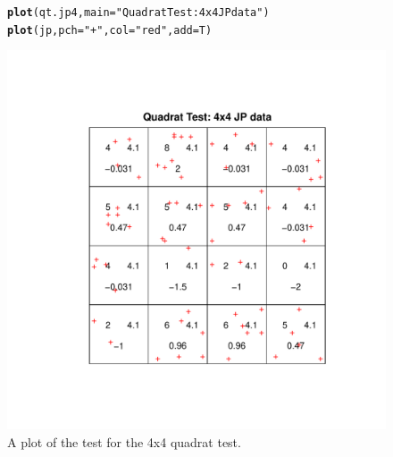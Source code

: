 \documentclass{article}\usepackage[]{graphicx}\usepackage[]{color}
\makeatletter
\def\maxwidth{ %
  \ifdim\Gin@nat@width>\linewidth
    \linewidth
  \else
    \Gin@nat@width
  \fi
}
\newcommand{\hlstr}[1]{\textcolor[rgb]{0.192,0.494,0.8}{#1}}%
\newcommand{\hlstd}[1]{\textcolor[rgb]{0.345,0.345,0.345}{#1}}%
\newcommand{\hlkwc}[1]{\textcolor[rgb]{0.333,0.667,0.333}{#1}}%
\newcommand{\hlkwd}[1]{\textcolor[rgb]{0.737,0.353,0.396}{\textbf{#1}}}%
\newenvironment{kframe}{%
 \def\at@end@of@kframe{}%
 \ifinner\ifhmode%
  \def\at@end@of@kframe{\end{minipage}}%
  \begin{minipage}{\columnwidth}%
 \fi\fi%
 \def\FrameCommand##1{\hskip\@totalleftmargin \hskip-\fboxsep
 \colorbox{shadecolor}{##1}\hskip-\fboxsep
     \hskip-\linewidth \hskip-\@totalleftmargin \hskip\columnwidth}%
 \MakeFramed {\advance\hsize-\width
   \@totalleftmargin\z@ \linewidth\hsize
   \@setminipage}}%
 {\par\unskip\endMakeFramed%
 \at@end@of@kframe}
\newenvironment{knitrout}{}{} %
\makeatother
\begin{document}
\begin{figure}
\begin{knitrout}
\color{fgcolor}\begin{kframe}
\begin{alltt}
\hlkwd{plot}\hlstd{(qt.jp4,} \hlkwc{main}\hlstd{=}\hlstr{"Quadrat Test: 4x4 JP data"}\hlstd{)}
\hlkwd{plot}\hlstd{(jp,} \hlkwc{pch}\hlstd{=}\hlstr{"+"}\hlstd{,} \hlkwc{col}\hlstd{=}\hlstr{"red"}\hlstd{,} \hlkwc{add}\hlstd{=T)}
\end{alltt}
\end{kframe}
\includegraphics[width=\maxwidth]{figure/plottests4x4} 

\end{knitrout}
\caption{A plot of the test for the 4x4 quadrat test.}
\label{qt.jp4}
\end{figure}
\FloatBarrier
\end{document}
